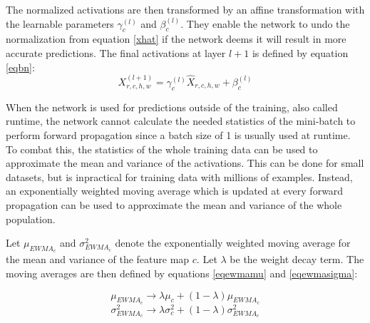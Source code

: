\documentclass[a4paper, twoside]{article}
\begin{document}
The normalized activations are then transformed by an affine transformation with the learnable parameters $\gamma_{c}^{(l)}$ and $\beta_{c}^{(l)}$. They enable the network to undo the normalization from equation \eqref{xhat} if the network deems it will result in more accurate predictions. The final activations at layer $l+1$ is defined by equation \eqref{eqbn}: \cite{cs231n} \cite{batchnorm}
\begin{equation}\label{eqbn}
X^{(l+1)}_{r,c,h,w} = \gamma_{c}^{(l)} \hat{X}_{r,c,h,w} + \beta_{c}^{(l)}
\end{equation}

When the network is used for predictions outside of the training, also called runtime, the network cannot calculate the needed statistics of the mini-batch to perform forward propagation since a batch size of 1 is usually used at runtime. To combat this, the statistics of the whole training data can be used to approximate the mean and variance of the activations. This can be done for small datasets, but is inpractical for training data with millions of examples. Instead, an exponentially weighted moving average which is updated at every forward propagation can be used to approximate the mean and variance of the whole population. \cite{cs231n} \cite{batchnorm}

Let $\mu_{EWMA_c}$ and $\sigma^2_{EWMA_c}$ denote the exponentially weighted moving average for the mean and variance of the feature map $c$. Let $\lambda$ be the weight decay term. The moving averages are then defined by equations \eqref{eqewmamu} and \eqref{eqewmasigma}:

\begin{equation}\label{eqewmamu}
\mu_{EWMA_c} \to \lambda \mu_c + (1-\lambda)\mu_{EWMA_c}
\end{equation}
\begin{equation}\label{eqewmasigma}
\sigma^2_{EWMA_c} \to \lambda \sigma^2_c + (1-\lambda)\sigma^2_{EWMA_c}
\end{equation}
\end{document}
